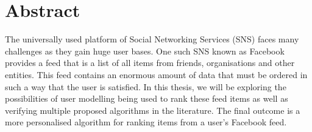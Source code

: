 \chapter*{Abstract}\label{abstract}
The universally used platform of Social Networking Services (SNS) faces many challenges as they gain huge user bases. One such SNS known as Facebook provides a feed that is a list of all items from friends, organisations and other entities. This feed contains an enormous amount of data that must be ordered in such a way that the user is satisfied. In this thesis, we will be exploring the possibilities of user modelling being used to rank these feed items as well as verifying multiple proposed algorithms in the literature. The final outcome is a more personalised algorithm for ranking items from a user’s Facebook feed.
